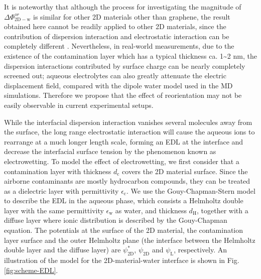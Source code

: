 \documentclass[aps,prl,reprint,groupedaddress,amsmath,amssymb, showpacs]{revtex4-1}
\begin{document}
It is noteworthy that although the process for investigating the
magnitude of \(\Delta \Phi_{\mathrm{2D-w}}^{or}\) is similar for other 2D
materials other than graphene, the result obtained here cannot be
readily applied to other 2D materials, since the contribution of
dispersion interaction and electrostatic interaction can be completely
different \cite{Govind_Rajan_2016,Chow_2015}. Nevertheless, in
real-world measurements, due to the existence of the contamination
layer which has a typical thickness ca. 1\textasciitilde{}2 nm, the dispersion
interactions contributed by surface charge can be nearly completely
screened out; aqueous electrolytes can also greatly attenuate the
electric displacement field, compared with the dipole water model used
in the MD simulations. Therefore we propose that the effect of
reorientation may not be easily observable in current experimental
setups.


While the interfacial dispersion interaction vanishes several
molecules away from the surface, the long range electrostatic
interaction will cause the aqueous ions to rearrange at a much longer
length scale, forming an EDL at the interface and decrease the
interfacial surface tension by the phenomenon known as
electrowetting. To model the effect of electrowetting, we first
consider that a contamination layer with thickness \(d_{\mathrm{c}}\)
covers the 2D material surface. Since the airborne contaminants are
mostly hydrocarbon compounds, they can be treated as a dielectric
layer with permittivity \(\epsilon_{\mathrm{c}}\). We use the
Gouy-Chapman-Stern model to describe the EDL in the aqueous phase,
which consists a Helmholtz double layer with the same permittivity
\(\epsilon_{\mathrm{w}}\) as water, and thickness \(d_{\mathrm{H}}\),
together with a diffuse layer where ionic distribution is described by
the Gouy-Chapman equation.  The potentials at the surface of the 2D
material, the contamination layer surface and the outer Helmholtz
plane (the interface between the Helmholtz double layer and the
diffuse layer) are \(\psi_{\mathrm{2D}}^{*}\), \(\psi_{\mathrm{2D}}\) and
\(\psi_{\mathrm{L}}\), respectively. An illustration of the model for the
2D-material-water interface is shown in Fig. \ref{fig:scheme-EDL}.
\end{document}
